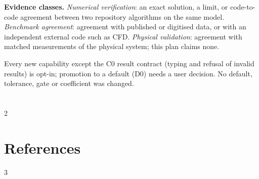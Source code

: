\documentclass[11pt,letterpaper]{article}
\begin{document}
\textbf{Evidence classes.} \emph{Numerical verification}: an exact solution, a limit,
or code-to-code agreement between two repository algorithms on the same model.
\emph{Benchmark agreement}: agreement with published or digitised data, or with an
independent external code such as CFD. \emph{Physical validation}: agreement with
matched measurements of the physical system; this plan claims none.

Every new capability except the C0 result contract (typing and refusal of invalid
results) is opt-in; promotion to a default (D0) needs a user decision. No default,
tolerance, gate or coefficient was changed.

\vspace{0.3em}
\section*{\contentsname}
\makeatletter
{\footnotesize\setlength{\parskip}{0pt}\renewcommand{\addvspace}[1]{\vspace{0.5pt}}%
\setlength{\columnsep}{18pt}\begin{multicols}{2}\end{multicols}}
\makeatother















\section*{References}
\renewcommand{\bibsection}{}
\begin{multicols}{3}

\end{multicols}
\end{document}
